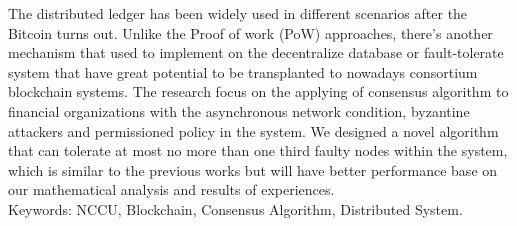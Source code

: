 \begin{abstracten}
The distributed ledger has been widely used in different scenarios after the Bitcoin turns out.
Unlike the Proof of work (PoW) approaches, there’s another mechanism that used to implement on the decentralize database or fault-tolerate system that have great potential to be transplanted to nowadays consortium blockchain systems.
The research focus on the applying of consensus algorithm to financial organizations with the asynchronous network condition, byzantine attackers and permissioned policy in the system.
We designed a novel algorithm that can tolerate at most no more than one third faulty nodes within the system, which is similar to the previous works but will have better performance base on our mathematical analysis and results of experiences.\\

\noindent
Keywords: NCCU, Blockchain, Consensus Algorithm, Distributed System. 
\end{abstracten}
